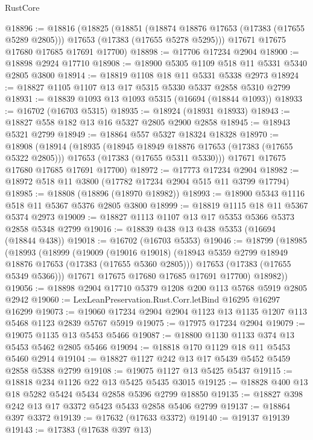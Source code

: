 \begin{lexlean}{RustCore}
\begin{coremodule}
@18896 := @18816
    (@18825
      (@18851
        (@18874 @18876 @17653 (@17383 (@17655 @5289 @2805)))
        @17653
        (@17383 (@17655 @5278 @5295)))
      @17671
      @17675
      @17680
      @17685
      @17691
      @17700)
@18898 := @17706 @17234 @2904
@18900 := @18898 @2924 @17710
@18908 := @18900 @5305 @1109 @518 @11 @5331 @5340 @2805 @3800
@18914 := @18819 @1108 @18 @11 @5331 @5338 @2973
@18924 := @18827 @1105 @1107 @13 @17 @5315 @5330 @5337 @2858 @5310 @2799
@18931 := @18839 @1093 @13 @1093 @5315 (@16694 (@18844 @1093))
@18933 := @16702 (@16703 @5315)
@18935 := @18924 (@18931 @18933)
@18943 := @18827 @558 @182 @13 @16 @5327 @2805 @2900 @2858
@18945 := @18943 @5321 @2799
@18949 := @18864 @557 @5327 @18324 @18328
@18970 := @18908
    (@18914
      (@18935
        (@18945 @18949 @18876 @17653 (@17383 (@17655 @5322 @2805)))
        @17653
        (@17383 (@17655 @5311 @5330)))
      @17671
      @17675
      @17680
      @17685
      @17691
      @17700)
@18972 := @17773 @17234 @2904
@18982 := @18972 @518 @11 @3800 (@17782 @17234 @2904 @515 @11 @3799 @17794)
@18985 := @18808 (@18896 (@18970 @18982))
@18993 := @18900 @5343 @1116 @518 @11 @5367 @5376 @2805 @3800
@18999 := @18819 @1115 @18 @11 @5367 @5374 @2973
@19009 := @18827 @1113 @1107 @13 @17 @5353 @5366 @5373 @2858 @5348 @2799
@19016 := @18839 @438 @13 @438 @5353 (@16694 (@18844 @438))
@19018 := @16702 (@16703 @5353)
@19046 := @18799
    (@18985
      (@18993
        (@18999
          (@19009
            (@19016 @19018)
            (@18943 @5359 @2799 @18949 @18876 @17653 (@17383 (@17655 @5360 @2805)))
            @17653
            (@17383 (@17655 @5349 @5366)))
          @17671
          @17675
          @17680
          @17685
          @17691
          @17700)
        @18982))
@19056 := @18898 @2904 @17710 @5379 @1208 @200 @113 @5768 @5919 @2805 @2942
@19060 := LexLeanPreservation.Rust.Corr.letBind @16295 @16297 @16299
@19073 := @19060 @17234 @2904 @2904 @1123 @13 @1135 @1207 @113 @5468 @1123 @2839 @5767 @5919
@19075 := @17975 @17234 @2904
@19079 := @19075 @1135 @13 @5453 @5466
@19087 := @18800 @1130 @1133 @374 @13 @5453 @5462 @2805 @5466
@19094 := @18818 @170 @1129 @18 @11 @5453 @5460 @2914
@19104 := @18827 @1127 @242 @13 @17 @5439 @5452 @5459 @2858 @5388 @2799
@19108 := @19075 @1127 @13 @5425 @5437
@19115 := @18818 @234 @1126 @22 @13 @5425 @5435 @3015
@19125 := @18828 @400 @13 @18 @5282 @5424 @5434 @2858 @5396 @2799 @18850
@19135 := @18827 @398 @242 @13 @17 @3372 @5423 @5433 @2858 @5406 @2799
@19137 := @18864 @397 @3372
@19139 := @17632 (@17633 @3372)
@19140 := @19137 @19139
@19143 := @17383 (@17638 @397 @13)

\end{coremodule}
\end{lexlean}
